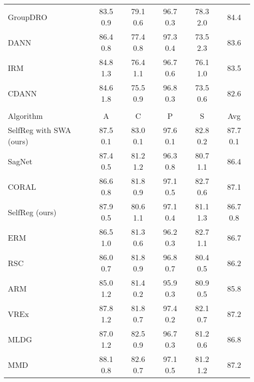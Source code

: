 \documentclass[10pt,twocolumn,letterpaper]{article}
\begin{document}
\begin{table*}[ht]
\begin{center}
{\begin{tabular}{lccccc}
GroupDRO~\cite{sagawa2019distributionally}             & 83.5  0.9       & 79.1  0.6       & 96.7  0.3       & 78.3  2.0       & 84.4        \\
DANN~\cite{ganin2016domain}                 & 86.4  0.8       & 77.4  0.8       & 97.3  0.4       & 73.5  2.3       & 83.6                 \\
IRM~\cite{arjovsky2019invariant}                  & 84.8  1.3       & 76.4  1.1       & 96.7  0.6       & 76.1  1.0       & 83.5                 \\
CDANN~\cite{li2018deep}                & 84.6  1.8       & 75.5  0.9       & 96.8  0.3       & 73.5  0.6       & 82.6                 \\
\toprule
\rowcolor{Gray}
\multicolumn{6}{c}{Model selection: test-domain validation set (oracle)} \\ \midrule
Algorithm   & A       & C       & P         & S         & Avg\\ \midrule
SelfReg with SWA (ours)     & 87.5  0.1     & 83.0  0.1     & 97.6  0.1      & 82.8  0.2    & 87.7  0.1     \\ \midrule
SagNet~\cite{nam2019reducing}               & 87.4  0.5       & 81.2  1.2       & 96.3  0.8       & 80.7  1.1       & 86.4                 \\
CORAL~\cite{sun2016deep}                & 86.6  0.8       & 81.8  0.9       & 97.1  0.5       & 82.7  0.6       & 87.1                 \\
SelfReg (ours)       & 87.9  0.5	    & 80.6  1.1	       & 97.1  0.4 	& 81.1  1.3    & 86.7  0.8 \\ 
ERM~\cite{vapnik1999overview}       & 86.5  1.0       & 81.3  0.6       & 96.2  0.3       & 82.7  1.1       & 86.7 \\ 
RSC~\cite{huangRSC2020}                  & 86.0  0.7       & 81.8  0.9       & 96.8  0.7       & 80.4  0.5       & 86.2                 \\
ARM~\cite{zhang2020adaptive}                  & 85.0  1.2       & 81.4  0.2       & 95.9  0.3       & 80.9  0.5       & 85.8                 \\
VREx~\cite{krueger2020out}                 & 87.8  1.2       & 81.8  0.7       & 97.4  0.2       & 82.1  0.7       & 87.2                 \\
MLDG~\cite{li2018learning}                 & 87.0  1.2       & 82.5  0.9       & 96.7  0.3       & 81.2  0.6       & 86.8                 \\
MMD~\cite{li2018domain}                  & 88.1  0.8       & 82.6  0.7       & 97.1  0.5       & 81.2  1.2       & 87.2                 \\

\end{tabular}}
\end{center}
\end{table*}
\end{document}
